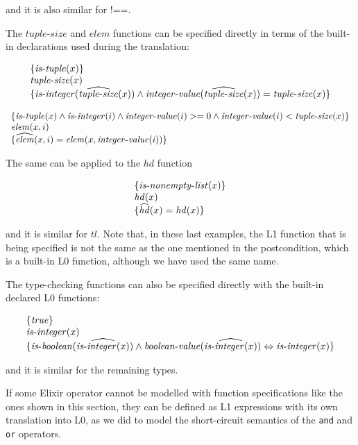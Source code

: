 and it is also similar for $\texttt{!==}$.

The $\mathit{tuple\mbox{-}size}$ and $\mathit{elem}$ functions can be specified directly 
in terms of the built-in declarations used during the translation:

\[
\begin{array}{l}
\{ \mathit{is\mbox{-}tuple}(x) \}\\
\mathit{tuple\mbox{-}size}(x)\\
\{ \mathit{is\mbox{-}integer}(\widehat{\mathit{tuple\mbox{-}size}}(x)) \wedge 
  \mathit{integer\mbox{-}value}(\widehat{\mathit{tuple\mbox{-}size}}(x)) = \mathit{tuple\mbox{-}size}(x) \}
\end{array}
\]

\[
\begin{array}{l}
\{ \mathit{is\mbox{-}tuple}(x) \wedge \mathit{is\mbox{-}integer}(i) \wedge \mathit{integer\mbox{-}value}(i) >= 0 \wedge \mathit{integer\mbox{-}value}(i) < \mathit{tuple\mbox{-}size}(x) \}\\
\mathit{elem}(x, i)\\
\{ \widehat{\mathit{elem}}(x, i) = \mathit{elem}(x, \mathit{integer\mbox{-}value}(i)) \}
\end{array}
\]

The same can be applied to the $\mathit{hd}$ function

\[
\begin{array}{l}
\{ \mathit{is\mbox{-}nonempty\mbox{-}list}(x) \}\\
\mathit{hd}(x)\\
\{ \widehat{\mathit{hd}}(x) = \mathit{hd}(x) \}
\end{array}
\]

and it is similar for $\mathit{tl}$. Note that, in these last examples, the L1
function that is being specified is not the same as the one mentioned in the
postcondition, which is a built-in L0 function, although we have used the same
name.

The type-checking functions can also be specified directly with the built-in
declared L0 functions:

\[
\begin{array}{l}
\{ \mathit{true} \}\\
\mathit{is\mbox{-}integer}(x)\\
\{ \mathit{is\mbox{-}boolean}(\widehat{\mathit{is\mbox{-}integer}(x)}) \wedge 
  \mathit{boolean\mbox{-}value}(\widehat{\mathit{is\mbox{-}integer}(x)}) \Leftrightarrow \mathit{is\mbox{-}integer}(x) \}
\end{array}
\]

and it is similar for the remaining types.

If some Elixir operator cannot be modelled with function specifications like the
ones shown in this section, they can be defined as L1 expressions with its own 
translation into L0, as we did to model the short-circuit semantics of the 
\verb|and| and \verb|or| operators.

